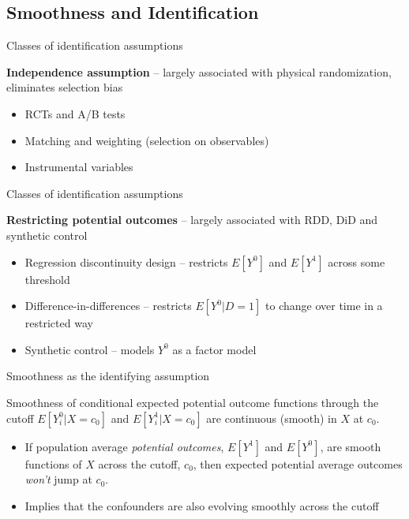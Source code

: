 \documentclass{beamer}
\begin{document}
	





\subsection{Smoothness and Identification}

\begin{frame}{Classes of identification assumptions}


\textbf{Independence assumption} -- largely associated with physical randomization, eliminates selection bias
	\begin{itemize}
	\item RCTs and A/B tests
	\item Matching and weighting (selection on observables)
	\item Instrumental variables
	\end{itemize}
	
\end{frame}


\begin{frame}{Classes of identification assumptions}


\textbf{Restricting potential outcomes} -- largely associated with RDD, DiD and synthetic control
	\begin{itemize}
	\item Regression discontinuity design -- restricts $E[Y^0]$ and $E[Y^1]$ across some threshold
	\item Difference-in-differences -- restricts $E[Y^0 | D=1]$ to change over time in a restricted way\
	\item Synthetic control -- models $Y^0$ as a factor model
	\end{itemize}
	
\end{frame}


\begin{frame}{Smoothness as the identifying assumption}
	
	\begin{block}{Smoothness of conditional expected potential outcome functions through the cutoff}
	$E[Y_i^0 | X=c_0]$ and $E[Y_i^1 | X=c_0]$ are continuous (smooth) in $X$ at $c_0$. 
	\end{block}
	
	\begin{itemize}
	\item If population average \emph{potential outcomes}, $E[Y^1]$ and $E[Y^0]$, are smooth functions of $X$ across the cutoff, $c_0$, then expected potential average outcomes \emph{won't} jump at $c_0$. 
	\item Implies that the confounders are also evolving smoothly across the cutoff 
	\end{itemize}
	
\end{frame}
\end{document}
